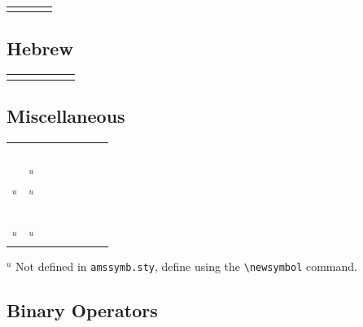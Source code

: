 \documentclass[11pt, a4paper, oneside]{article}
\theoremstyle{Plain}
\theoremstyle{Definition}
\theoremstyle{Remark}
\begin{document}
\begin{appendix}
	\begin{tabular}{*4l}
	\X\digamma      &\X\varkappa
	\end{tabular}

	\subsection{{} Hebrew \showfamily}

	\begin{tabular}{*6l}
	\X\beth &\X\daleth      &\X\gimel
	\end{tabular}

	\subsection{{} Miscellaneous \showfamily}

	\begin{tabular}{*8l}
	\X\hbar         &\X\hslash      \\ \X\vartriangle &\X\triangledown      \\
	\X\square       &\X\lozenge     \\ \X\circledS    &\X\angle             \\
	\X\measuredangle&\X\nexists     \\ \X\mho         &\X\Finv$^u$          \\
	\X\Game$^u$     &\X\Bbbk$^u$    \\ \X\backprime   &\X\varnothing        \\
	\X\blacktriangle&\X\blacktriangledown \\ \X\blacksquare&\X\blacklozenge  \\
	\X\bigstar      &\X\sphericalangle     \\ \X\complement  &\X\eth       \\
	\X\diagup$^u$   &\X\diagdown$^u$
	\end{tabular}

	$^u$ Not defined in {\tt amssymb.sty}, define using the
	\verb|\newsymbol| command.

	\subsection{{} Binary Operators \showfamily}


\end{appendix}
\end{document}
